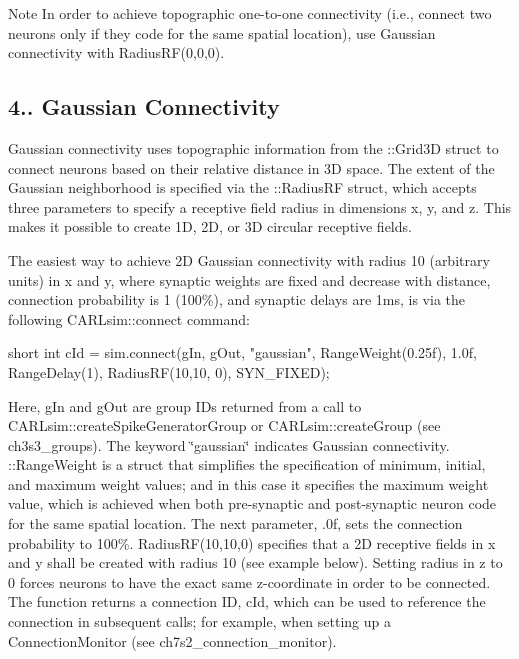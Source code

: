 \begin{DoxyNote}{Note}
In order to achieve topographic one-\/to-\/one connectivity (i.\+e., connect two neurons only if they code for the same spatial location), use Gaussian connectivity with Radius\+R\+F(0,0,0).
\end{DoxyNote}
\hypertarget{ch4_connections_ch4s1s8_gaussian}{}\subsection{4.. Gaussian Connectivity}\label{ch4_connections_ch4s1s8_gaussian}
Gaussian connectivity uses topographic information from the \+::\+Grid3D struct to connect neurons based on their relative distance in 3D space. The extent of the Gaussian neighborhood is specified via the \+::\+Radius\+RF struct, which accepts three parameters to specify a receptive field radius in dimensions x, y, and z. This makes it possible to create 1D, 2D, or 3D circular receptive fields.

The easiest way to achieve 2D Gaussian connectivity with radius 10 (arbitrary units) in x and y, where synaptic weights are fixed and decrease with distance, connection probability is 1 (100\%), and synaptic delays are 1ms, is via the following C\+A\+R\+Lsim\+::connect command\+: 
\begin{DoxyCode}
\textcolor{keywordtype}{short} \textcolor{keywordtype}{int} cId = sim.connect(gIn, gOut, \textcolor{stringliteral}{"gaussian"}, RangeWeight(0.25f), 1.0f, RangeDelay(1), RadiusRF(10,10,
      0), SYN\_FIXED);
\end{DoxyCode}
 Here, {\ttfamily g\+In} and {\ttfamily g\+Out} are group I\+Ds returned from a call to C\+A\+R\+Lsim\+::create\+Spike\+Generator\+Group or C\+A\+R\+Lsim\+::create\+Group (see ch3s3\+\_\+groups). The keyword \char`\"{}gaussian\char`\"{} indicates Gaussian connectivity. \+::\+Range\+Weight is a struct that simplifies the specification of minimum, initial, and maximum weight values; and in this case it specifies the maximum weight value, which is achieved when both pre-\/synaptic and post-\/synaptic neuron code for the same spatial location. The next parameter, {.\+0f}, sets the connection probability to 100\%. Radius\+R\+F(10,10,0) specifies that a 2D receptive fields in x and y shall be created with radius 10 (see example below). Setting radius in z to 0 forces neurons to have the exact same z-\/coordinate in order to be connected. The function returns a connection ID, {\ttfamily c\+Id}, which can be used to reference the connection in subsequent calls; for example, when setting up a Connection\+Monitor (see ch7s2\+\_\+connection\+\_\+monitor).

